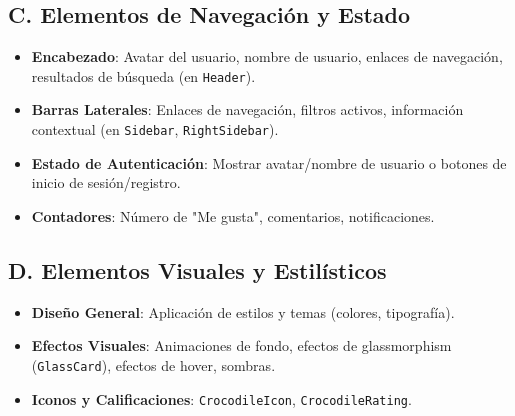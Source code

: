 \documentclass{article}
\begin{document}
\subsection*{C. Elementos de Navegación y Estado}
\begin{itemize}
    \item \textbf{Encabezado}: Avatar del usuario, nombre de usuario, enlaces de navegación, resultados de búsqueda (en \texttt{Header}).
    \item \textbf{Barras Laterales}: Enlaces de navegación, filtros activos, información contextual (en \texttt{Sidebar}, \texttt{RightSidebar}).
    \item \textbf{Estado de Autenticación}: Mostrar avatar/nombre de usuario o botones de inicio de sesión/registro.
    \item \textbf{Contadores}: Número de "Me gusta", comentarios, notificaciones.
\end{itemize}

\subsection*{D. Elementos Visuales y Estilísticos}
\begin{itemize}
    \item \textbf{Diseño General}: Aplicación de estilos y temas (colores, tipografía).
    \item \textbf{Efectos Visuales}: Animaciones de fondo, efectos de glassmorphism (\texttt{GlassCard}), efectos de hover, sombras.
    \item \textbf{Iconos y Calificaciones}: \texttt{CrocodileIcon}, \texttt{CrocodileRating}.
\end{itemize}
\end{document}
